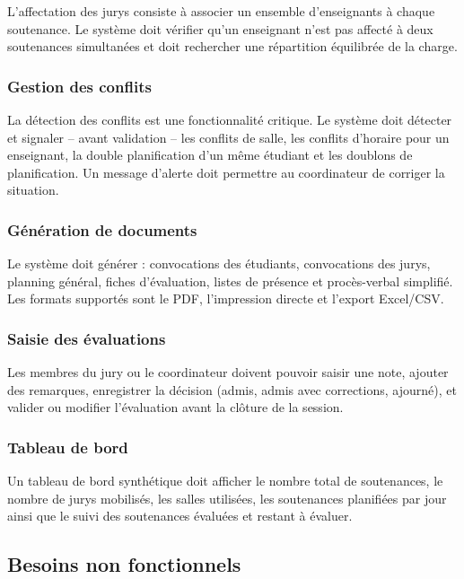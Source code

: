 \documentclass[12pt,a4paper]{article}
\begin{document}
L'affectation des jurys consiste à associer un ensemble d'enseignants à chaque
soutenance. Le système doit vérifier qu'un enseignant n'est pas affecté à deux
soutenances simultanées et doit rechercher une répartition équilibrée de la
charge.

\subsubsection{Gestion des conflits}
\label{subsubsec:gestion_conflits}

La détection des conflits est une fonctionnalité critique. Le système doit
détecter et signaler -- avant validation -- les conflits de salle, les conflits
d'horaire pour un enseignant, la double planification d'un même étudiant et les
doublons de planification. Un message d'alerte doit permettre au coordinateur de
corriger la situation.

\subsubsection{Génération de documents}
\label{subsubsec:generation_documents}

Le système doit générer : convocations des étudiants, convocations des jurys,
planning général, fiches d'évaluation, listes de présence et procès-verbal
simplifié. Les formats supportés sont le PDF, l'impression directe et l'export
Excel/CSV.

\subsubsection{Saisie des évaluations}
\label{subsubsec:saisie_evaluations}

Les membres du jury ou le coordinateur doivent pouvoir saisir une note, ajouter
des remarques, enregistrer la décision (admis, admis avec corrections, ajourné),
et valider ou modifier l'évaluation avant la clôture de la session.

\subsubsection{Tableau de bord}
\label{subsubsec:tableau_de_bord}

Un tableau de bord synthétique doit afficher le nombre total de soutenances, le
nombre de jurys mobilisés, les salles utilisées, les soutenances planifiées par
jour ainsi que le suivi des soutenances évaluées et restant à évaluer.

\subsection{Besoins non fonctionnels}
\label{subsec:besoins_non_fonctionnels}
\end{document}
